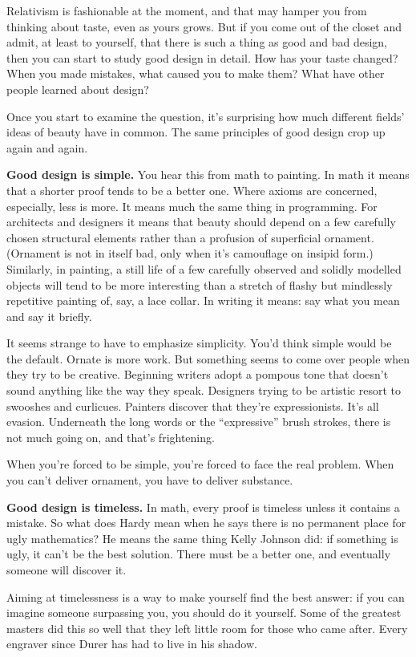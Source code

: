Relativism is fashionable at the moment, and that may hamper you from
thinking about taste, even as yours grows. But if you come out of the
closet and admit, at least to yourself, that there is such a thing as
good and bad design, then you can start to study good design in detail.
How has your taste changed? When you made mistakes, what caused you to
make them? What have other people learned about design?

Once you start to examine the question, it's surprising how much
different fields' ideas of beauty have in common. The same principles of
good design crop up again and again.

\textbf{Good design is simple.} You hear this from math to painting. In
math it means that a shorter proof tends to be a better one. Where
axioms are concerned, especially, less is more. It means much the same
thing in programming. For architects and designers it means that beauty
should depend on a few carefully chosen structural elements rather than
a profusion of superficial ornament. (Ornament is not in itself bad,
only when it's camouflage on insipid form.) Similarly, in painting, a
still life of a few carefully observed and solidly modelled objects will
tend to be more interesting than a stretch of flashy but mindlessly
repetitive painting of, say, a lace collar. In writing it means: say
what you mean and say it briefly.

It seems strange to have to emphasize simplicity. You'd think simple
would be the default. Ornate is more work. But something seems to come
over people when they try to be creative. Beginning writers adopt a
pompous tone that doesn't sound anything like the way they speak.
Designers trying to be artistic resort to swooshes and curlicues.
Painters discover that they're expressionists. It's all evasion.
Underneath the long words or the ``expressive'' brush strokes, there is
not much going on, and that's frightening.

When you're forced to be simple, you're forced to face the real problem.
When you can't deliver ornament, you have to deliver substance.

\textbf{Good design is timeless.} In math, every proof is timeless
unless it contains a mistake. So what does Hardy mean when he says there
is no permanent place for ugly mathematics? He means the same thing
Kelly Johnson did: if something is ugly, it can't be the best solution.
There must be a better one, and eventually someone will discover it.

Aiming at timelessness is a way to make yourself find the best answer:
if you can imagine someone surpassing you, you should do it yourself.
Some of the greatest masters did this so well that they left little room
for those who came after. Every engraver since Durer has had to live in
his shadow.


